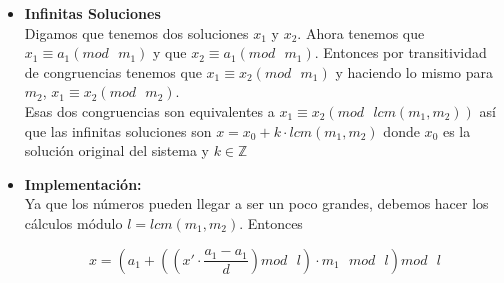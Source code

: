 \begin{itemize}
{		Ya que conocemos los valores de $a_1, a_2, m_1$ y $m_2$, solo hay que resolver una ecuaci\'on
		diof\'antica. Sea $d = gcd(m_1, m_2)$, sabemos que divide el primer miembro de la ecuaci\'on, 
		as\'i que para que haya soluciones, debe dividir tambi\'en al segundo. \\
		Usando el Algoritmo Extendido de Euclides, podemos encontrar un par $(x', y')$ tal que 
		$m_1 x' + m_2 y' = d $ . Luego multiplicamos ambos miembros por $\frac{a_1-a_2}{d}$, obteniendo
		
		$$m_1 x' \frac{a_1-a_2}{d} + m_2 y' \frac{a_1-a_2}{d} = a_1 - a_2 $$ 
		
		Entonces $k_1 = -x' \frac{a_1-a_2}{d} $ y $ k_2 = y' \frac{a_1-a_2}{d} $ Ahora podemos sustituir 
		$k_1$ en el segundo sistema para obtener $$ x = a_1 + x' \frac{a_2-a_1}{d} m_1 $$ 		 
    }
    \item{
		\textbf{Infinitas Soluciones}\\
		Digamos que tenemos dos soluciones $x_1$ y $x_2$. Ahora tenemos que $x_1 \equiv a_1 (mod\text{ } m_1)$ 
		y que $x_2 \equiv a_1 (mod\text{ } m_1)$. Entonces por transitividad de congruencias tenemos que 
		$ x_1 \equiv x_2 (mod\text{ } m_1) $ y haciendo lo mismo para $m_2$, $ x_1 \equiv x_2 (mod\text{ } m_2) $. \\
		Esas dos congruencias son equivalentes a $ x_1 \equiv x_2 (mod\text{ } lcm(m_1, m_2)) $ as\'i que las 
		infinitas soluciones son $x = x_0 + k \cdot lcm(m_1, m_2)$ donde $x_0$ es la soluci\'on original del
		sistema y $k \in \mathbb{Z}$
		
    }
    \item{
		\textbf{Implementaci\'on:}\\
		Ya que los n\'umeros pueden llegar a ser un poco grandes, debemos hacer los c\'alculos m\'odulo $l = lcm(m_1, m_2)$.
		Entonces
		
		$$ x = \left(a_1 + \left( \left(x' \cdot \frac{a_1 - a_1}{d}\right) mod\text{ }l \right) \cdot m_1 \text{ } mod\text{ }l\right) mod\text{ }l  $$
		
}
\end{itemize}

